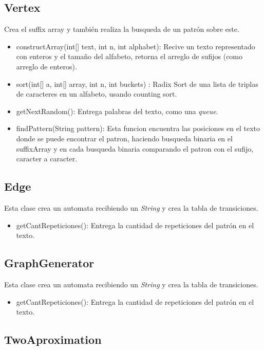 \documentclass[letterpaper,10pt]{article}
\begin{document}
	\subsection{Vertex}

	Crea el suffix array y también realiza la busqueda de un patrón sobre este.
	
	\begin{itemize}
		\item constructArray(int[] text, int n, int alphabet): Recive un texto representado con enteros y el tamaño del alfabeto, retorna el arreglo de sufijos (como arreglo de enteros).
		\item sort(int[] a, int[] array, int n, int buckets) : Radix Sort de una lista de triplas de caracteres en un alfabeto, usando counting sort.
		\item getNextRandom(): Entrega palabras del texto, como una \textit{queue}.
		\item findPattern(String pattern): Esta funcion encuentra las posiciones en el texto donde se puede encontrar el  patron, haciendo busqueda binaria en el suffixArray y en cada busqueda binaria comparando el patron con el sufijo, caracter a caracter.
	\end{itemize}

	\subsection{Edge}

	Esta clase crea un automata recibiendo un \textit{String} y crea la tabla de transiciones.
	
	\begin{itemize}
	 \item getCantRepeticiones(): Entrega la cantidad de repeticiones del patrón en el texto.
	\end{itemize}
	
	\subsection{GraphGenerator}

	Esta clase crea un automata recibiendo un \textit{String} y crea la tabla de transiciones.
	
	\begin{itemize}
	 \item getCantRepeticiones(): Entrega la cantidad de repeticiones del patrón en el texto.
	\end{itemize}
	
	\subsection{TwoAproximation}
\end{document}
